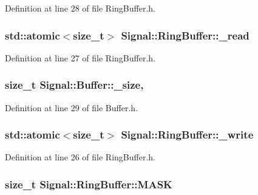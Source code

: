 Definition at line 28 of file Ring\+Buffer.\+h.

\hypertarget{classSignal_1_1RingBuffer_a4bdf5d626567f423b480398aef2e8bb0}{
\subsubsection[{\+\_\+read}]{\setlength{\rightskip}{0pt plus 5cm}std\+::atomic$<$size\+\_\+t$>$ Signal\+::\+Ring\+Buffer\+::\+\_\+read\hspace{0.3cm}{\ttfamily [protected]}}}\label{classSignal_1_1RingBuffer_a4bdf5d626567f423b480398aef2e8bb0}


Definition at line 27 of file Ring\+Buffer.\+h.

\hypertarget{classSignal_1_1Buffer_ab4c8969e972323306ee51538ad70577b}{
\subsubsection[{\+\_\+size}]{\setlength{\rightskip}{0pt plus 5cm}size\+\_\+t Signal\+::\+Buffer\+::\+\_\+size\hspace{0.3cm}{\ttfamily [protected]}, {\ttfamily [inherited]}}}\label{classSignal_1_1Buffer_ab4c8969e972323306ee51538ad70577b}


Definition at line 29 of file Buffer.\+h.

\hypertarget{classSignal_1_1RingBuffer_a121cbb3679c61132fad237c671d08bef}{
\subsubsection[{\+\_\+write}]{\setlength{\rightskip}{0pt plus 5cm}std\+::atomic$<$size\+\_\+t$>$ Signal\+::\+Ring\+Buffer\+::\+\_\+write\hspace{0.3cm}{\ttfamily [protected]}}}\label{classSignal_1_1RingBuffer_a121cbb3679c61132fad237c671d08bef}


Definition at line 26 of file Ring\+Buffer.\+h.

\hypertarget{classSignal_1_1RingBuffer_a6f0dc159e6d625b8352988c6a0577ffe}{
\subsubsection[{M\+A\+S\+K}]{\setlength{\rightskip}{0pt plus 5cm}size\+\_\+t Signal\+::\+Ring\+Buffer\+::\+M\+A\+S\+K\hspace{0.3cm}{\ttfamily [protected]}}}\label{classSignal_1_1RingBuffer_a6f0dc159e6d625b8352988c6a0577ffe}


